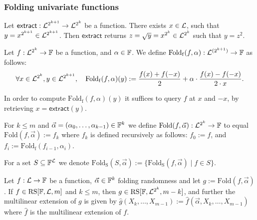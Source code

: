 \subsubsection{Folding univariate functions}

\begin{definition}\label{def:extract}
    Let $\mathsf{extract}:\mathcal{L}^{2^{k+1}}\rightarrow \mathcal{L}^{2^k}$ be a function. There exists $x \in \mathcal{L}$, such that $y = x^{2^{k+1}}\in\mathcal{L}^{2^{k+1}}$. Then $\mathsf{extract}$ returns $z = \sqrt{y} = x^{2^k}\in\mathcal{L}^{2^k}$ such that $y = z^2$.
\end{definition}

\begin{definition}
    Let $f : \mathcal{L}^{2^k} \to \mathbb{F}$ be a function, and $\alpha \in \mathbb{F}$. We define $\mathrm{Fold_f}(f, {\alpha}) : \mathcal{L}^{(2^{k+1})} \to \mathbb{F}$ as follows:
    \[
    \forall x \in \mathcal{L}^{2^k}, y \in \mathcal{L}^{2^{k+1}}, \quad \mathrm{Fold_f}(f, \alpha)(y) := \frac{f(x) + f(-x)}{2} + \alpha \cdot \frac{f(x) - f(-x)}{2 \cdot x}.
    \]

    In order to compute $\mathrm{Fold_f}(f, \alpha)(y)$ it suffices to query $f$ at $x$ and $-x$, by retrieving $x=\mathsf{extract}(y)$.
\end{definition}

\begin{definition}
    For $k \leq m$ and $\vec{\alpha} = (\alpha_0, \ldots, \alpha_{k-1}) \in \mathbb{F}^k$ we define $\mathrm{Fold}(f, \vec{\alpha}) : \mathcal{L}^{2^k} \to \mathbb{F}$ to equal $\mathrm{Fold}(f, \vec{\alpha}) := f_k$ where $f_k$ is defined recursively as follows: $f_0 := f$, and $f_i := \mathrm{Fold_f}(f_{i-1}, \alpha_i)$. 
\end{definition}

\begin{definition}
    For a set $S \subseteq \mathbb{F}^{\mathcal{L}}$ we denote $\mathrm{Fold_{S}}(S, \vec{\alpha}) := \{\mathrm{Fold_{S}}(f, \vec{\alpha}) \mid f \in S\}$.
\end{definition}

\begin{lemma}
    Let $f : \mathcal{L} \to \mathbb{F}$ be a function, $\vec{\alpha} \in \mathbb{F}^k$ folding randomness and let $g := \mathrm{Fold}(f, \vec{\alpha})$. If $f \in \mathrm{RS}[\mathbb{F}, \mathcal{L}, m]$ and $k \leq m$, then $g \in \mathrm{RS}[\mathbb{F}, \mathcal{L}^{2^k}, m - k]$, and further the multilinear extension of $g$ is given by $\hat{g}(X_k, \ldots, X_{m-1}) := \hat{f}(\vec{\alpha}, X_k, \ldots, X_{m-1})$ where $\hat{f}$ is the multilinear extension of $f$.
\end{lemma}

